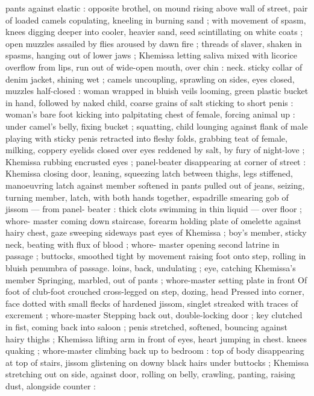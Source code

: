 pants against elastic : opposite brothel, on mound rising above wall 
of street, pair of loaded camels copulating, kneeling in burning sand 
; with movement of spasm, knees digging deeper into cooler, heavier 
sand, seed scintillating on white coats ; open muzzles assailed by 
flies aroused by dawn fire ; threads of slaver, shaken in spasms, 
hanging out of lower jaws ; Khemissa letting saliva mixed with licorice 
overflow from lips, run out of wide-open mouth, over chin : neck. 
sticky collar of denim jacket, shining wet ; camels uncoupling, 
sprawling on sides, eyes closed, muzzles half-closed : woman 
wrapped in bluish veils looming, green plastic bucket in hand, 
followed by naked child, coarse grains of salt sticking to short penis 
: woman's bare foot kicking into palpitating chest of female, forcing 
animal up : under camel's belly, fixing bucket ; squatting, child 
lounging against flank of male playing with sticky penis retracted 
into fleshy folds, grabbing teat of female, milking, coppery eyelids 
closed over eyes reddened by salt, by fury of night-love ; Khemissa 
rubbing encrusted eyes ; panel-beater disappearing at corner of 
street : Khemissa closing door, leaning, squeezing latch between 
thighs, legs stiffened, manoeuvring latch against member softened in 
pants pulled out of jeans, seizing, turning member, latch, with both 
hands together, espadrille smearing gob of jissom --- from panel- 
beater : thick clots swimming in thin liquid --- over floor ; whore- 
master coming down staircase, forearm holding plate of omelette 
against hairy chest, gaze sweeping sideways past eyes of Khemissa 
; boy's member, sticky neck, beating with flux of blood ; whore- 
master opening second latrine in passage ; buttocks, smoothed tight 
by movement raising foot onto step, rolling in bluish penumbra of 
passage. loins, back, undulating ; eye, catching Khemissa's member 
Springing, marbled, out of pants ; whore-master setting plate in front 
Of foot of club-foot crouched cross-legged on step, dozing, head 
Pressed into corner, face dotted with small flecks of hardened 
jissom, singlet streaked with traces of excrement ; whore-master 
Stepping back out, double-locking door ; key clutched in fist, coming 
back into saloon ; penis stretched, softened, bouncing against hairy 
thighs ; Khemissa lifting arm in front of eyes, heart jumping in chest. 
knees quaking ; whore-master climbing back up to bedroom : top of 
body disappearing at top of stairs, jissom glistening on downy black 
hairs under buttocks ; Khemissa stretching out on side, against door, 
rolling on belly, crawling, panting, raising dust, alongside counter : 
